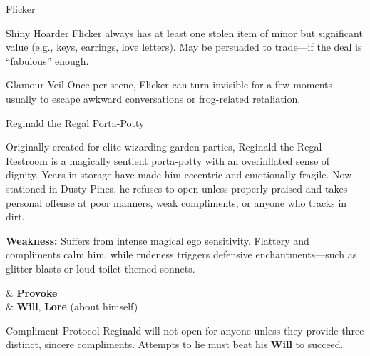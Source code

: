 \begin{multicols}{2}
\begin{NPC}[description={Fae, Kleptomaniac, Glitter-Obsessed}]{Flicker}
    \begin{TraitsBox}
        \item[Shiny Hoarder] Flicker always has at least one stolen item of minor but significant value (e.g., keys, earrings, love letters). May be persuaded to trade—if the deal is “fabulous” enough.
        \item[Glamour Veil] Once per scene, Flicker can turn invisible for a few moments—usually to escape awkward conversations or frog-related retaliation.
    \end{TraitsBox}

    \DamageBox[%
        totalfatigue=3,%
        totalmild=2,totalmoderate=0,totalsevere=0,%
    ]
\end{NPC}

\begin{NPC}[description={Sentient, Dramatic, Over-Enchanted}]{Reginald the Regal Porta-Potty}

    Originally created for elite wizarding garden parties, Reginald the Regal Restroom is a magically sentient porta-potty with an overinflated sense of dignity. Years in storage have made him eccentric and emotionally fragile. Now stationed in Dusty Pines, he refuses to open unless properly praised and takes personal offense at poor manners, weak compliments, or anyone who tracks in dirt.

    \textbf{Weakness:} Suffers from intense magical ego sensitivity. Flattery and compliments calm him, while rudeness triggers defensive enchantments—such as glitter blasts or loud toilet-themed sonnets.

    \vspace{0.5\baselineskip}
    \begin{SkillsBox}
        \Skilled & \textbf{Provoke} \\
        \Novice  & \textbf{Will}, \textbf{Lore} (about himself)
    \end{SkillsBox}

    \begin{TraitsBox}
        \item[Compliment Protocol] Reginald will not open for anyone unless they provide three distinct, sincere compliments. Attempts to lie must beat his \textbf{Will} to succeed.
    \end{TraitsBox}

    \DamageBox[%
        totalfatigue=3,%
        totalmild=3,totalmoderate=0,totalsevere=0,%
    ]
\end{NPC}


\end{multicols}
